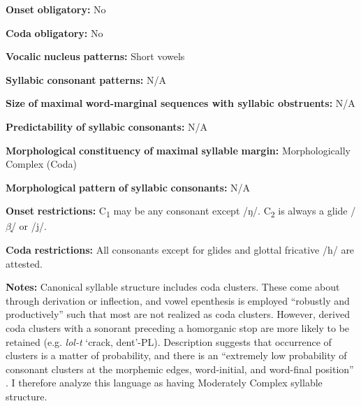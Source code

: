 \documentclass[output=paper]{langsci/langscibook}
\begin{document}
\begin{styleBody}
\textbf{Onset} \textbf{obligatory:} No
\end{styleBody}

\begin{styleBody}
\textbf{Coda} \textbf{obligatory:} No
\end{styleBody}

\begin{styleBody}
\textbf{Vocalic} \textbf{nucleus} \textbf{patterns:} Short vowels
\end{styleBody}

\begin{styleBody}
\textbf{Syllabic} \textbf{consonant} \textbf{patterns:} N/A
\end{styleBody}

\begin{styleBody}
\textbf{Size} \textbf{of} \textbf{maximal} \textbf{word{}-marginal sequences with syllabic obstruents:} N/A
\end{styleBody}

\begin{styleBody}
\textbf{Predictability} \textbf{of} \textbf{syllabic} \textbf{consonants:} N/A
\end{styleBody}

\begin{styleBody}
\textbf{Morphological} \textbf{constituency} \textbf{of} \textbf{maximal} \textbf{syllable} \textbf{margin:} Morphologically Complex (Coda)
\end{styleBody}

\begin{styleBody}
\textbf{Morphological} \textbf{pattern} \textbf{of} \textbf{syllabic} \textbf{consonants:} N/A
\end{styleBody}

\begin{styleBody}
\textbf{Onset} \textbf{restrictions:} C\textsubscript{1} may be any consonant except /ŋ/. C\textsubscript{2} is always a glide /$\beta ̞$/ or /j/.
\end{styleBody}

\begin{styleBody}
\textbf{Coda} \textbf{restrictions:} All consonants except for glides and glottal fricative /h/ are attested. 
\end{styleBody}

\begin{styleBody}
\textbf{Notes:} Canonical syllable structure includes coda clusters. These come about through derivation or inflection, and vowel epenthesis is employed “robustly and productively” such that most are not realized as coda clusters. However, derived coda clusters with a sonorant preceding a homorganic stop are more likely to be retained (e.g. \textit{lol-t} ‘crack, dent’-PL). Description suggests that occurrence of clusters is a matter of probability, and there is an “extremely low probability of consonant clusters at the morphemic edges, word-initial, and word-final position” \citep[55]{Filchenko2007}. I therefore analyze this language as having Moderately Complex syllable structure.
\end{styleBody}
\end{document}
